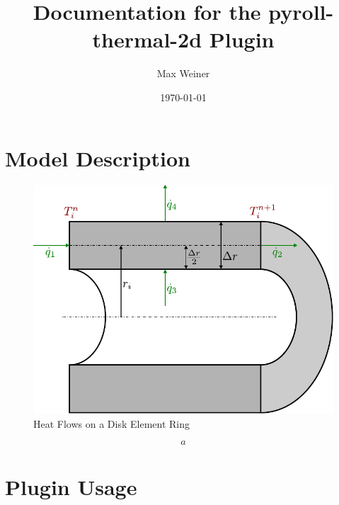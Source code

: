 \documentclass{scrartcl}
\begin{document}
    \title{Documentation for the pyroll-thermal-2d Plugin}
    \author{Max Weiner}
    \date{\today}

    \maketitle


    \section{Model Description}\label{sec:model-description}



    \begin{figure}
        \centering
        \includegraphics[scale=0.8]{img/heat_flow}
        \caption{Heat Flows on a Disk Element Ring}
        \label{fig:heat_flow}
    \end{figure}

    \begin{equation}
        a
        \label{eq:mass-flow}
    \end{equation}


    \section{Plugin Usage}\label{sec:plugin-usage}

    

    \printbibliography
\end{document}
